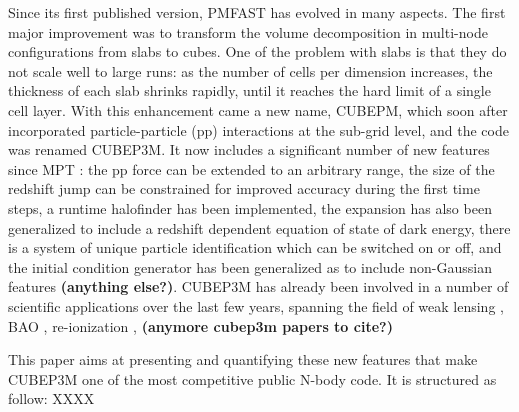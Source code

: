 Since its first published version, {\small PMFAST} has evolved in many aspects. 
The first major improvement was to transform the volume decomposition in multi-node configurations 
from slabs to cubes. One of the problem with slabs is that they do not scale well to large runs: 
as the number of cells per dimension increases, the thickness of each slab shrinks rapidly,
until it reaches the hard limit of a single cell layer.  With this enhancement came a new name, {\small CUBEPM},
which soon after incorporated particle-particle (pp) interactions at the sub-grid level, and the code was renamed
{\small CUBEP3M}. It now includes a significant number of new features since MPT : the pp force
can be extended to an arbitrary range, the size of the redshift jump can be constrained for improved accuracy during the first time steps,
a runtime halofinder has been implemented, the expansion has also been generalized to include a redshift dependent equation of state of dark energy, there is a system of unique particle identification which can be switched on or off, and the initial condition generator has been generalized as to include non-Gaussian features
{\bf (anything else?)}.
{\small CUBEP3M} has already been involved in a number of scientific applications over the last few years,
spanning the field of weak lensing \citep{Sanaz_Lu, Lu_dore, Dore_Lu, Harnois_Vafaei, LuCMBLensing},  BAO
 \citep{HarnoisPen, Ngan,Zhang, Yu, HarnoisYu in prep.}, re-ionization \citep{Ilian...}, {\bf (anymore cubep3m papers to cite?)}  

This paper aims at presenting and quantifying these new features that make {\small CUBEP3M} one of the most competitive public N-body code.
It is structured as follow: XXXX 



